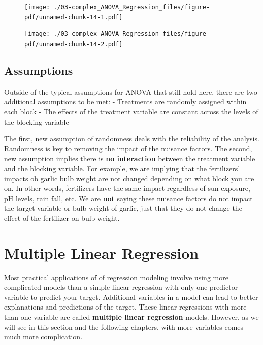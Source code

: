 \documentclass[
  letterpaper,
  DIV=11,
  numbers=noendperiod]{scrreprt}
\begin{document}
\begin{figure}[H]

{\centering \texttt{[image: ./03-complex\_ANOVA\_Regression\_files/figure-pdf/unnamed-chunk-14-1.pdf]}

}

\end{figure}

\begin{figure}[H]

{\centering \texttt{[image: ./03-complex\_ANOVA\_Regression\_files/figure-pdf/unnamed-chunk-14-2.pdf]}

}

\end{figure}

\hypertarget{assumptions-1}{%
\subsection{Assumptions}\label{assumptions-1}}

Outside of the typical assumptions for ANOVA that still hold here, there
are two additional assumptions to be met: - Treatments are randomly
assigned within each block - The effects of the treatment variable are
constant across the levels of the blocking variable

The first, new assumption of randomness deals with the reliability of
the analysis. Randomness is key to removing the impact of the nuisance
factors. The second, new assumption implies there is \textbf{no
interaction} between the treatment variable and the blocking variable.
For example, we are implying that the fertilizers' impacts ob garlic
bulb weight are not changed depending on what block you are on. In other
words, fertilizers have the same impact regardless of sun exposure, pH
levels, rain fall, etc. We are \textbf{not} saying these nuisance
factors do not impact the target variable or bulb weight of garlic, just
that they do not change the effect of the fertilizer on bulb weight.

\hypertarget{multiple-linear-regression}{%
\section{Multiple Linear Regression}\label{multiple-linear-regression}}

Most practical applications of of regression modeling involve using more
complicated models than a simple linear regression with only one
predictor variable to predict your target. Additional variables in a
model can lead to better explanations and predictions of the target.
These linear regressions with more than one variable are called
\textbf{multiple linear regression} models. However, as we will see in
this section and the following chapters, with more variables comes much
more complication.
\end{document}
